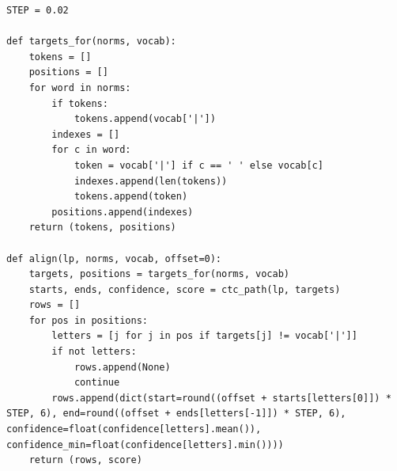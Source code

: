\begin{lstlisting}
STEP = 0.02

def targets_for(norms, vocab):
    tokens = []
    positions = []
    for word in norms:
        if tokens:
            tokens.append(vocab['|'])
        indexes = []
        for c in word:
            token = vocab['|'] if c == ' ' else vocab[c]
            indexes.append(len(tokens))
            tokens.append(token)
        positions.append(indexes)
    return (tokens, positions)

def align(lp, norms, vocab, offset=0):
    targets, positions = targets_for(norms, vocab)
    starts, ends, confidence, score = ctc_path(lp, targets)
    rows = []
    for pos in positions:
        letters = [j for j in pos if targets[j] != vocab['|']]
        if not letters:
            rows.append(None)
            continue
        rows.append(dict(start=round((offset + starts[letters[0]]) * STEP, 6), end=round((offset + ends[letters[-1]]) * STEP, 6), confidence=float(confidence[letters].mean()), confidence_min=float(confidence[letters].min())))
    return (rows, score)
\end{lstlisting}
